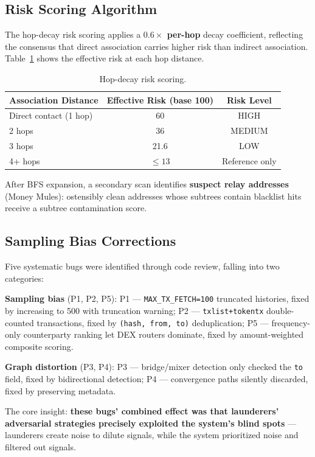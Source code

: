 \documentclass[12pt,a4paper]{article}
\begin{document}
\subsection{Risk Scoring Algorithm}

The hop-decay risk scoring applies a \textbf{$0.6\times$ per-hop} decay coefficient, reflecting the consensus that direct association carries higher risk than indirect association. Table~\ref{tab:hop_decay} shows the effective risk at each hop distance.

\begin{table}[htbp]
\centering
\caption{Hop-decay risk scoring.}
\label{tab:hop_decay}
\small
\begin{tabular}{lcc}
\toprule
\textbf{Association Distance} & \textbf{Effective Risk (base 100)} & \textbf{Risk Level} \\
\midrule
Direct contact (1 hop) & 60 & HIGH \\
2 hops & 36 & MEDIUM \\
3 hops & 21.6 & LOW \\
4+ hops & $\leq 13$ & Reference only \\
\bottomrule
\end{tabular}
\end{table}

After BFS expansion, a secondary scan identifies \textbf{suspect relay addresses} (Money Mules): ostensibly clean addresses whose subtrees contain blacklist hits receive a subtree contamination score.

\subsection{Sampling Bias Corrections}

Five systematic bugs were identified through code review, falling into two categories:

\textbf{Sampling bias} (P1, P2, P5): P1 --- \texttt{MAX\_TX\_FETCH=100} truncated histories, fixed by increasing to 500 with truncation warning; P2 --- \texttt{txlist+tokentx} double-counted transactions, fixed by \texttt{(hash, from, to)} deduplication; P5 --- frequency-only counterparty ranking let DEX routers dominate, fixed by amount-weighted composite scoring.

\textbf{Graph distortion} (P3, P4): P3 --- bridge/mixer detection only checked the \texttt{to} field, fixed by bidirectional detection; P4 --- convergence paths silently discarded, fixed by preserving metadata.

The core insight: \textbf{these bugs' combined effect was that launderers' adversarial strategies precisely exploited the system's blind spots} --- launderers create noise to dilute signals, while the system prioritized noise and filtered out signals.
\end{document}
